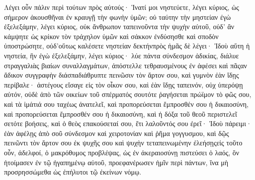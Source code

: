 Λέγει οὖν πάλιν περὶ τούτων πρὸς αὐτούς· Ἱνατί μοι νηστεύετε, λέγει κύριος, ὡς σήμερον ἀκουσθῆναι ἐν κραυγῇ τὴν φωνὴν ὑμῶν; οὐ ταύτην τὴν μηστείαν ἐγὼ ἐξελεξάμην, λέγει κύριος, οὐκ ἄνθρωπον ταπεινοῦντα τὴν ψυχὴν αὐτοῦ, οὐδ’ ἂν κάμψητε ὡς κρίκον τὸν τράχηλον ὑμῶν καὶ σάκκον ἐνδύσησθε καὶ σποδὸν ὑποστρώσητε, οὐδ’οὕτως καλέσετε νηστείαν δεκτήνπρὸς ἡμᾶς δὲ λέγει· Ἰδοὺ αὕτη ἡ νηστεία, ἣν ἐγὼ ἐξελεξάμην, λέγει κύριος· λύε πάντα σύνδεσμον ἀδικίας, διάλυε στραγγαλιὰς βιαίων συναλλαγμάτων, ἀπόστελλε τεθραυσμένους ἐν ἀφέσει καὶ πᾶςαν ἄδικον συγγραφὴν διάσπαδιάθρυπτε πεινῶσιν τὸν ἄρτον σου, καὶ γυμνὸν ἐὰν ἴδῃς περίβαλε· ἀστέγους εἴσαγε εἰς τὸν οἶκον σου, καὶ ἐὰν ἴδῃς ταπεινόν, οὐχ ὑπερόψῃ αὐτόν, οὐδὲ ἀπὸ τῶν οικείων τοῦ σπέρματός σουτότε ῥαγήσεται πρώϊμον τὸ φῶς σου, καὶ τὰ ἱμάτιά σου ταχέως ἀνατελεῖ, καὶ προπορεύσεται ἔμπροσθέν σου ἡ δικαιοσύνη, καὶ προπορεύσεται ἔμπροσθέν σου ἡ δικαιοσύνη, καὶ ἡ δόξα τοῦ θεοῦ περιστελεῖ σετότε βοήσεις, καὶ ὁ θεὸς επακούσεταί σου, ἔτι λαλοῦντός σου ἐρεῖ· Ἰδοὺ πάρειμι· ἐὰν ἀφέλῃς ἀπὸ σοῦ σύνδεσμον καὶ χειροτονίαν καὶ ῥῆμα γογγυσμου, καὶ δῷς πεινῶντι τὸν ἄρτον σου ἐκ ψυχῆς σου καὶ ψυχὴν τεταπεινωμένην ἐλεήσῃςεἰς τοῦτο οὖν, ἀδελφοί, ὁ μακρόθυμος προβλέψας, ὡς ἐν ἀκεραιοσύνῃ πιστεύσει ὁ λαός, ὃν ἡτοίμασεν ἐν τῷ ἠγαπημένῳ αὐτοῦ, προεφανέρωσεν ἡμῖν περὶ πάντων, ἵνα μὴ προσρησσώμεθα ὡς ἐπήλυτοι τῷ ἐκείνων νόμῳ.
